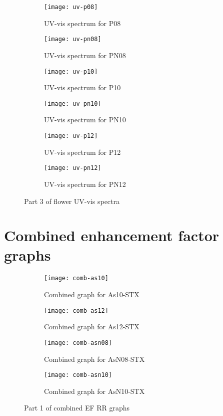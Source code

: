 \newpage

\begin{figure*}[h]
\centering
\begin{subfigure}{8.25cm}\centering\texttt{[image: uv-p08]}\caption{UV-vis spectrum for P08}\end{subfigure}%
\begin{subfigure}{8.25cm}\centering\texttt{[image: uv-pn08]}\caption{UV-vis spectrum for PN08}\end{subfigure}
\begin{subfigure}{8.25cm}\centering\texttt{[image: uv-p10]}\caption{UV-vis spectrum for P10}\end{subfigure}%
\begin{subfigure}{8.25cm}\centering\texttt{[image: uv-pn10]}\caption{UV-vis spectrum for PN10}\end{subfigure}
\begin{subfigure}{8.25cm}\centering\texttt{[image: uv-p12]}\caption{UV-vis spectrum for P12}\end{subfigure}%
\begin{subfigure}{8.25cm}\centering\texttt{[image: uv-pn12]}\caption{UV-vis spectrum for PN12}\end{subfigure}
\caption[Part 3 of flower UV-vis spectra]{Part 3 of flower UV-vis spectra}
\end{figure*}


\newpage
\section{Combined enhancement factor graphs}

\begin{figure*}[h]
\centering
\begin{subfigure}{8.25cm}\centering\texttt{[image: comb-as10]}\caption{Combined graph for As10-STX}\end{subfigure}%
\begin{subfigure}{8.25cm}\centering\texttt{[image: comb-as12]}\caption{Combined graph for As12-STX}\end{subfigure}
\begin{subfigure}{8.25cm}\centering\texttt{[image: comb-asn08]}\caption{Combined graph for AsN08-STX}\end{subfigure}%
\begin{subfigure}{8.25cm}\centering\texttt{[image: comb-asn10]}\caption{Combined graph for AsN10-STX}\end{subfigure}
\caption[Part 1 of combined EF RR graphs]{Part 1 of combined EF RR graphs}
\end{figure*}

